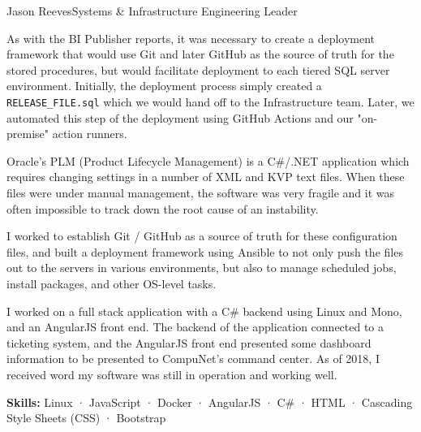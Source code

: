 \documentclass{article}
\begin{document}
\begin{cv}{Jason Reeves}{Systems \& Infrastructure Engineering Leader}
\begin{cvevent}[2018-2020]
    \vspace*{3mm}
    As with the BI Publisher reports, it was necessary to create a deployment framework that would use Git and later GitHub as the source of truth for the stored procedures, but would facilitate deployment to each tiered SQL server environment.  Initially, the deployment process simply created a \texttt{RELEASE\_FILE.sql} which we would hand off to the Infrastructure team.  Later, we automated this step of the deployment using GitHub Actions and our "on-premise" action runners.
    \vspace*{5mm}
\end{cvevent}

\begin{cvevent}[2018-2020]
    Oracle's PLM (Product Lifecycle Management) is a C\#/.NET application which requires changing settings in a number of XML and KVP text files.  When these files were under manual management, the software was very fragile and it was often impossible to track down the root cause of an instability.

    \vspace*{3mm}
    I worked to establish Git / GitHub as a source of truth for these configuration files, and built a deployment framework using Ansible to not only push the files out to the servers in various environments, but also to manage scheduled jobs, install packages, and other OS-level tasks.  
    \vspace*{5mm}
\end{cvevent}

\newpage
{}
\begin{cvevent}[Sep 2016][Sep 2017]
  I worked on a full stack application with a C\# backend using Linux and Mono, and an AngularJS front end. The backend of the application connected to a ticketing system, and the AngularJS front end presented some dashboard information to be presented to CompuNet's command center. As of 2018, I received word my software was still in operation and working well.
  
  \vspace*{3mm}
  \textbf{Skills:} Linux · JavaScript · Docker · AngularJS · C\# · HTML · Cascading Style Sheets (CSS) · Bootstrap
  \vspace*{5mm}
\end{cvevent}


\end{cv}
\end{document}
